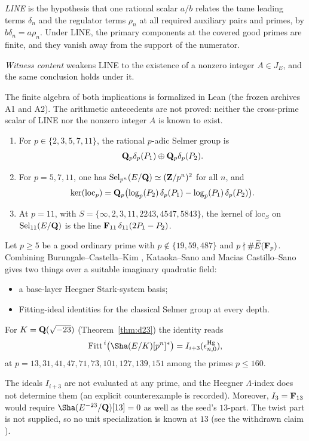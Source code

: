 \begin{researchrecord}\label{thm:line}
\emph{LINE} is the hypothesis that one rational scalar $a/b$ relates the tame leading terms $\delta_n$ and the regulator terms $\rho_n$ at all required auxiliary pairs and primes, by $b\delta_n=a\rho_n$. Under LINE, the primary components at the covered good primes are finite, and they vanish away from the support of the numerator.

\emph{Witness content} weakens LINE to the existence of a nonzero integer $A\in J_E$, and the same conclusion holds under it.
\end{researchrecord}
The finite algebra of both implications is formalized in Lean (the frozen archives A1 and A2). The arithmetic antecedents are not proved: neither the cross-prime scalar of LINE nor the nonzero integer $A$ is known to exist.

\begin{proposition}\label{prop:localsel}
\begin{enumerate}[label=(\roman*)]
\item For $p\in\{2,3,5,7,11\}$, the rational $p$-adic Selmer group is\[\mathbf{Q}_p\delta_p(P_1)\oplus\mathbf{Q}_p\delta_p(P_2).\]
\item For $p=5,7,11$, one has $\operatorname{Sel}_{p^n}(E/\mathbf{Q})\simeq(\mathbf{Z}/p^n)^2$ for all $n$, and
\[
\ker(\mathrm{loc}_p)=\mathbf{Q}_p\bigl(\log_p(P_2)\,\delta_p(P_1)-\log_p(P_1)\,\delta_p(P_2)\bigr).
\]
\item At $p=11$, with $S=\{\infty,2,3,11,2243,4547,5843\}$, the kernel of $\mathrm{loc}_S$ on $\operatorname{Sel}_{11}(E/\mathbf{Q})$ is the line $\mathbf{F}_{11}\,\delta_{11}(2P_1-P_2)$.
\end{enumerate}
\end{proposition}

\begin{researchrecord}\label{thm:mcs}
Let $p\ge5$ be a good ordinary prime with $p\notin\{19,59,487\}$ and $p\nmid\#\widetilde E(\mathbf{F}_p)$. Combining Burungale--Castella--Kim \cite{bck}, Kataoka--Sano and Macias Castillo--Sano \cite{mcs} gives two things over a suitable imaginary quadratic field:
\begin{itemize}[leftmargin=*]
\item a base-layer Heegner Stark-system basis;
\item Fitting-ideal identities for the classical Selmer group at every depth.
\end{itemize}
For $K=\mathbf{Q}(\sqrt{-23})$ (Theorem~\ref{thm:d23}) the identity reads
\[
\mathrm{Fitt}^{\,i}\bigl(\Sha(E/K)[p^n]^*\bigr)=I_{i+3}(\epsilon^{\mathrm{Hg}}_{n,0}),
\]
at $p=13,31,41,47,71,73,101,127,139,151$ among the primes $p\le160$.
\end{researchrecord}
The ideals $I_{i+3}$ are not evaluated at any prime, and the Heegner $\Lambda$-index does not determine them (an explicit counterexample is recorded). Moreover, $I_3=\mathbf{F}_{13}$ would require $\Sha(E^{-23}/\Q)[13]=0$ as well as the seed's $13$-part. The twist part is not supplied, so no unit specialization is known at $13$ (see the withdrawn claim ).

